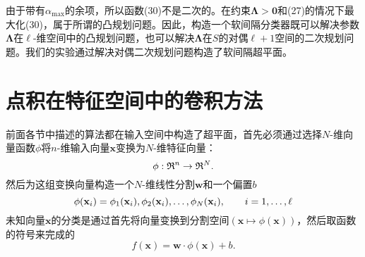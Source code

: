 \documentclass[lang=cn,11pt,a4paper]{elegantpaper}
\begin{document}
	由于带有$\alpha_\mathrm{max}$的余项，所以函数(30)不是二次的。在约束$\mathbf{\Lambda}>\mathbf{0}$和(27)的情况下最大化(30)，属于所谓的凸规划问题。因此，构造一个软间隔分类器既可以解决参数$\mathbf{\Lambda}$在$\ell$-维空间中的凸规划问题，也可以解决$\mathbf{\Lambda}$在$S$的对偶$\ell+1$空间的二次规划问题。我们的实验通过解决对偶二次规划问题构造了软间隔超平面。

	\section{点积在特征空间中的卷积方法}
	前面各节中描述的算法都在输入空间中构造了超平面，首先必须通过选择$N$-维向量函数$\phi$将$n$-维输入向量$\mathbf{x}$变换为$N$-维特征向量：
	\begin{equation}
		\phi:\mathfrak{R}^n\to\mathfrak{R}^N.\notag
	\end{equation}
	然后为这组变换向量构造一个$N$-维线性分割$\mathbf{w}$和一个偏置$b$
	\begin{equation}
		\phi(\mathbf{x}_i)=\phi_1(\mathbf{x}_i),\phi_2(\mathbf{x}_i),\dots,\phi_N(\mathbf{x}_i),\qquad i=1,\dots,\ell\notag
	\end{equation}
	未知向量$\mathbf{x}$的分类是通过首先将向量变换到分割空间$(\mathbf{x}\mapsto\phi(\mathbf{x}))$，然后取函数的符号来完成的
	\begin{equation}
		f(\mathbf{x})=\mathbf{w}·\phi(\mathbf{x})+b.\tag{31}
	\end{equation}
\end{document}

